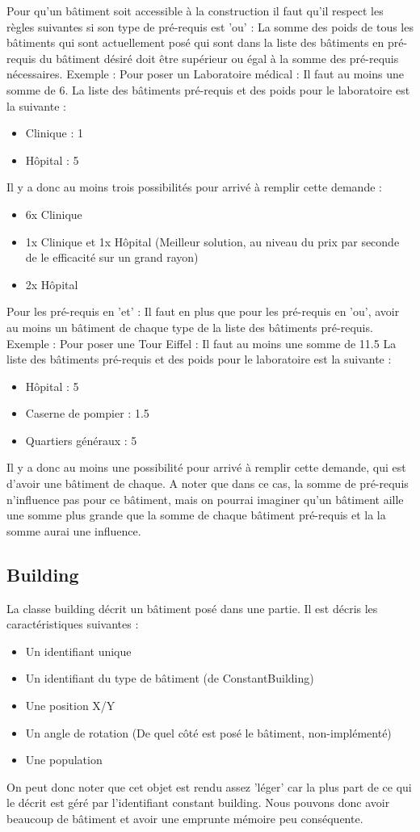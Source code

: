 \documentclass[a4paper,10pt,openany,oneside]{book}
\begin{document}
Pour qu'un bâtiment soit accessible à la construction il faut qu'il respect les règles suivantes si son type de pré-requis est 'ou' :
La somme des poids de tous les bâtiments qui sont actuellement posé qui sont dans la liste des bâtiments en pré-requis du bâtiment désiré doit être supérieur ou égal à la somme des pré-requis nécessaires.
Exemple :
Pour poser un Laboratoire médical : Il faut au moins une somme de 6.
La liste des bâtiments pré-requis et des poids pour le laboratoire est la suivante :
\begin{itemize}
	\item Clinique : 1
	\item Hôpital : 5
\end{itemize}
Il y a donc au moins trois possibilités pour arrivé à remplir cette demande :
\begin{itemize}
	\item 6x Clinique
	\item 1x Clinique et 1x Hôpital (Meilleur solution, au niveau du prix par seconde de le efficacité sur un grand rayon)
	\item 2x Hôpital
\end{itemize}

Pour les pré-requis en 'et' :
Il faut en plus que pour les pré-requis en 'ou', avoir au moins un bâtiment de chaque type de la liste des bâtiments pré-requis.
Exemple :
Pour poser une Tour Eiffel : Il faut au moins une somme de 11.5
La liste des bâtiments pré-requis et des poids pour le laboratoire est la suivante :
\begin{itemize}
	\item Hôpital : 5
	\item Caserne de pompier : 1.5
	\item Quartiers généraux : 5
\end{itemize}
Il y a donc au moins une possibilité pour arrivé à remplir cette demande, qui est d'avoir une bâtiment de chaque. A noter que dans ce cas, la somme de pré-requis n'influence pas pour ce bâtiment, mais on pourrai imaginer qu'un bâtiment aille une somme plus grande que la somme de chaque bâtiment pré-requis et la la somme aurai une influence.

\subsection{Building}
La classe building décrit un bâtiment posé dans une partie. Il est décris les caractéristiques suivantes :
\begin{itemize}
	\item Un identifiant unique
	\item Un identifiant du type de bâtiment (de ConstantBuilding)
	\item Une position X/Y
	\item Un angle de rotation (De quel côté est posé le bâtiment, non-implémenté)
	\item Une population
\end{itemize}
On peut donc noter que cet objet est rendu assez 'léger' car la plus part de ce qui le décrit est géré par l'identifiant constant building. Nous pouvons donc avoir beaucoup de bâtiment et avoir une emprunte mémoire peu conséquente.
\end{document}
